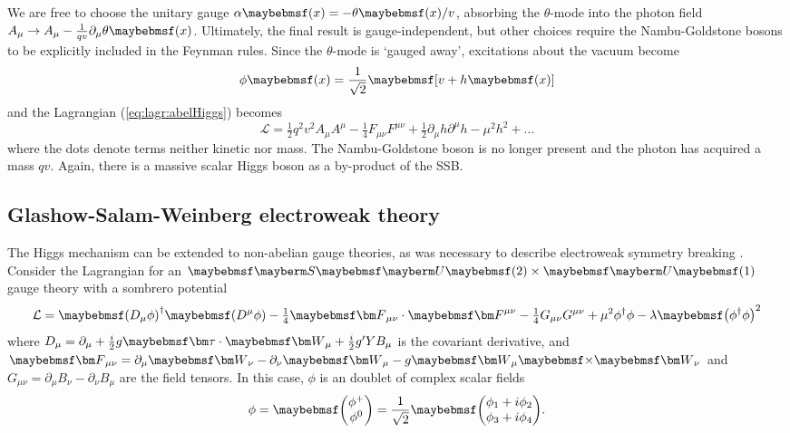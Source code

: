 We are free to choose the unitary gauge $\alpha\parenths{x} = -\theta\parenths{x}/v$,
absorbing the $\theta$-mode into the photon field 
$A_{\mu} \rightarrow A_{\mu} - \tfrac{1}{qv}\partial_{\mu} \theta\parenths{x}$. 
Ultimately, the final result is gauge-independent, but other choices require the 
Nambu-Goldstone bosons to be explicitly included in the Feynman rules. Since the 
$\theta$-mode is `gauged away', excitations about the vacuum become
\begin{equation}
	\phi\parenths{x} = \frac{1}{\sqrt{2}} \sqbracs{v + h\parenths{x}}
\end{equation}
and the Lagrangian (\ref{eq:lagr:abelHiggs}) becomes
\begin{equation}
	\mathcal{L}
	= \tfrac{1}{2} q^2 v^2 A_{\mu} A^{\mu}
	- \tfrac{1}{4} F_{\mu\nu}F^{\mu\nu}
	+ \tfrac{1}{2} \partial_{\mu}h \partial^{\mu}h
	- \mu^2 h^2
	+ \dots
\end{equation}
where the dots denote terms neither kinetic nor mass. 
The Nambu-Goldstone boson is no longer present and the photon has acquired a mass $qv$.
Again, there is a massive scalar Higgs boson as a by-product of the SSB.



\subsection{Glashow-Salam-Weinberg electroweak theory}
The Higgs mechanism can be extended to non-abelian gauge theories, as was necessary to 
describe electroweak symmetry breaking \cite{Kibble:1967,Weinberg:1967,Salam:1968}.
Consider the Lagrangian for an $\SUgroup{2}\times\Ugroup{1}$ gauge theory with a sombrero
potential
\begin{equation}
	\mathcal{L} 
	= \parenths{D_{\mu}\phi}^{\dagger} \parenths{D^{\mu}\phi}
	- \tfrac{1}{4} \bvec{F}_{\mu\nu} \cdot \bvec{F}^{\mu\nu}
	- \tfrac{1}{4} G_{\mu\nu} G^{\mu\nu}
	+ \mu^2 \phi^{\dagger} \phi - \lambda \parenths{\phi^{\dagger} \phi}^2
	\label{eq:lagr:ewHiggs}
\end{equation}
where $D_{\mu} = \partial_{\mu} + \tfrac{i}{2} g \bvec{\tau} \cdot \bvec{W}_{\mu} + 
\tfrac{i}{2} g' Y B_{\mu}$ is the covariant derivative, and $\bvec{F}_{\mu\nu} = 
\partial_{\mu}\bvec{W}_{\nu} - \partial_{\nu}\bvec{W}_{\mu} - g \bvec{W}_{\mu} \cross 
\bvec{W}_{\nu}$ and $G_{\mu\nu} = \partial_{\mu}B_{\nu} - \partial_{\nu}B_{\mu}$ are the
field tensors. In this case, $\phi$ is an  doublet of complex scalar fields
\begin{equation}
	\phi = \colvector{\phi^+\\\phi^0} = \frac{1}{\sqrt{2}} \colvector{ \phi_1 + i\phi_2\\ \phi_3 + i\phi_4}.
\end{equation}

